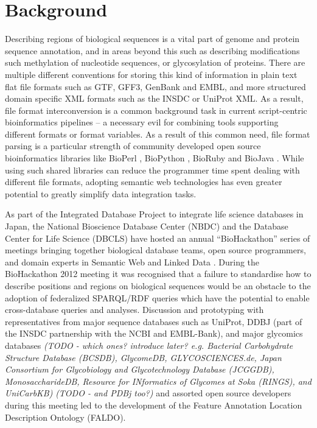 \section*{Background}
Describing regions of biological sequences is a vital part of genome and protein sequence
annotation, and in areas beyond this such as describing modifications such methylation
of nucleotide sequences, or glycosylation of proteins.
There are multiple different conventions for storing this kind of information in
plain text flat file formats such as GTF, GFF3, GenBank and EMBL,
and more structured domain specific XML formats such as the INSDC or UniProt XML.
As a result, file format interconversion is a common background task in current script-centric
bioinformatics pipelines -- a necessary evil for combining tools supporting different formats
or format variables. As a result of this common need, file format parsing is a
particular strength of community developed open source bioinformatics libraries like
BioPerl \cite{BioPerl2002}, BioPython \cite{Biopython2009}, BioRuby \cite{BioRuby2010}
and BioJava \cite{BioJava2012}. While using such shared libraries can reduce the
programmer time spent dealing with different file formats, adopting semantic
web technologies has even greater potential to greatly simplify data integration
tasks.

As part of the Integrated Database Project to integrate life science databases in
Japan, the National Bioscience Database Center (NBDC) and the Database
Center for Life Science (DBCLS) have hosted an annual ``BioHackathon'' series
of meetings bringing together biological database teams, open source programmers,
and domain experts in Semantic Web and Linked Data \cite{BioHack2010,BioHack2011and2012}.
During the BioHackathon 2012 meeting it was
recognised that a failure to standardise how to describe positions
and regions on biological sequences would be an obstacle to the adoption of federalized
SPARQL/RDF queries which have the potential to enable cross-database queries and
analyses. Discussion and prototyping with representatives from major sequence databases
such as UniProt, DDBJ (part of the INSDC partnership with the NCBI and EMBL-Bank),
and major glycomics databases \textit{(TODO - which ones? introduce later? e.g.
 Bacterial Carbohydrate Structure Database (BCSDB), GlycomeDB,
 GLYCOSCIENCES.de,
 Japan Consortium for Glycobiology and Glycotechnology Database (JCGGDB),
 MonosaccharideDB,
 Resource for INformatics of Glycomes at Soka (RINGS),
 and UniCarbKB)}
\textit{(TODO - and PDBj too?)} and assorted open source developers during this meeting
led to the development of the Feature Annotation Location Description Ontology (FALDO).

